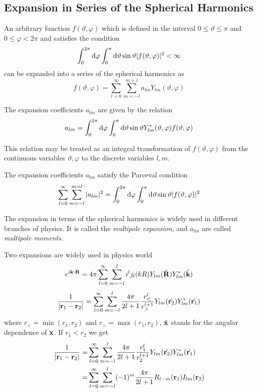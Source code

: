 \subsection{Expansion in Series of the Spherical Harmonics}
%
\par{An arbitrary function $f(\vartheta,\varphi)$ which is defined in the interval $0\le \vartheta \le
\pi$ and $0\le \varphi <2\pi$ and satisfies the condition}
\begin{equation}
\int_{0}^{2\pi}\text{d} \varphi \int_{0}^{\pi} \text{d} \vartheta \sin \vartheta
|f(\vartheta,\varphi)|^2< \infty
\end{equation} 
can be expanded into a series of the spherical harmonics as
\begin{equation}
\label{multipole}
f(\vartheta,\varphi)=\sum_{l=0}^{\infty}\sum_{m=-l}^{m=l}a_{lm}Y_{lm}(\vartheta,\varphi)
\end{equation}
\par{The expansion coefficients $a_{lm}$ are given by the relation}
\begin{equation}
a_{lm}=\int_{0}^{2\pi}\text{d} \varphi \int_{0}^{\pi} \text{d} \vartheta \sin \vartheta Y_{lm}^{*}(\vartheta,\varphi)f(\vartheta,\varphi)
\end{equation}
\par{This relation may be treated as an integral transformation of
$f(\vartheta,\varphi)$ from the continuous variables $\vartheta,\varphi$ to
the discrete variables $l,m$.}
\par{The expansion coefficients $a_{lm}$ satisfy the Parceval condition}
\begin{equation}
\sum_{l=0}^{\infty}\sum_{m=-l}^{m=l}|a_{lm}|^2=\int_{0}^{2\pi}\text{d} \varphi
\int_{0}^{\pi} \text{d} \vartheta \sin \vartheta |f(\vartheta,\varphi)|^2
\end{equation}
\par{The expansion  in terms of the spherical harmonics is
  widely used in different branches of physics. It is called the {\it
  multipole expansion}, and $a_{lm}$ are called {\it multipole moments}.}
\par{Two expansions are widely used in physics world}
\begin{equation}
\label{cwave}
e^{i{\bf k}\cdot {\bf R}}=4\pi
\sum_{l=0}^{\infty}\sum_{m=-l}^{l}i^lj_l(kR)Y_{lm}(\hat{\bf R})Y_{lm}^{*}(\hat{\bf k})
\end{equation}
\begin{equation}
\label{coulomb}
\frac{1}{|{\bf r}_1-{\bf r}_2|}=\sum_{l=0}^{\infty}\sum_{m=-l}^{l}\frac{4 \pi}{2l+1}\frac{r_<^l}{r_>^{l+1}}Y_{lm}(\hat{{\bf r}_2})Y_{lm}^{*}(\hat{{\bf r}_1})
\end{equation}
where $r_<=\min (r_1,r_2)$ and $r_>=\max (r_1,r_2)$, $\hat{\bf x}$ stands for
the angular dependence of ${\bf x}$. If $r_1<r_2$ we get
\begin{equation}
\begin{split}
\frac{1}{|{\bf r}_1-{\bf r}_2|}=&\sum_{l=0}^{\infty}\sum_{m=-l}^{l}\frac{4 \pi}{2l+1}\frac{r_1^l}{r_2^{l+1}}Y_{lm}(\hat{{\bf r}_2})Y_{lm}^{*}(\hat{{\bf r}_1})\\=&\sum_{l=0}^{\infty}\sum_{m=-l}^{l}(-1)^m\frac{4 \pi}{2l+1}R_{l-m}({\bf r}_1)I_{lm}({\bf r}_2)
\end{split}
\end{equation}
%
